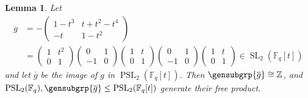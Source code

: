 \documentclass[a4paper,11pt]{amsproc}
\newcommand{\ints}{\mathbb{Z}}%
\newcommand{\finfield}{\mathbb{F}}%
\DeclareMathOperator{\SL}{SL}%
\DeclareMathOperator{\PSL}{PSL}%
\theoremstyle{plain}
\newtheorem{lemma}{Lemma}[section]
\theoremstyle{definition}
\begin{document}
	\begin{lemma}\label{lem:psl_2_free_prod}
		Let
		\begin{align*}
			g & =-
			\begin{pmatrix}
				1-t^3 & t+t^2-t^4 \\ -t & 1-t^2
			\end{pmatrix}\\
			& = \begin{pmatrix}
				1 & t^2 \\ 0 & 1
			\end{pmatrix}
			\begin{pmatrix}
				0 & 1 \\ -1 & 0
			\end{pmatrix}
			\begin{pmatrix}
				1 & t \\ 0 & 1
			\end{pmatrix}
			\begin{pmatrix}
				0 & 1 \\ -1 & 0
			\end{pmatrix}
			\begin{pmatrix}
				1 & t \\ 0 & 1
			\end{pmatrix}
			\in\SL_2(\finfield_q[t])
		\end{align*}
		and let $\overline{g}$ be the image of $g$ in $\PSL_2(\finfield_q[t])$. Then $\gensubgrp{\overline{g}}\cong\ints$, and $\PSL_2(\finfield_q),\gensubgrp{\overline{g}}\leq\PSL_2(\finfield_q[t])$ generate their free product. 
	\end{lemma}
	
\end{document}
